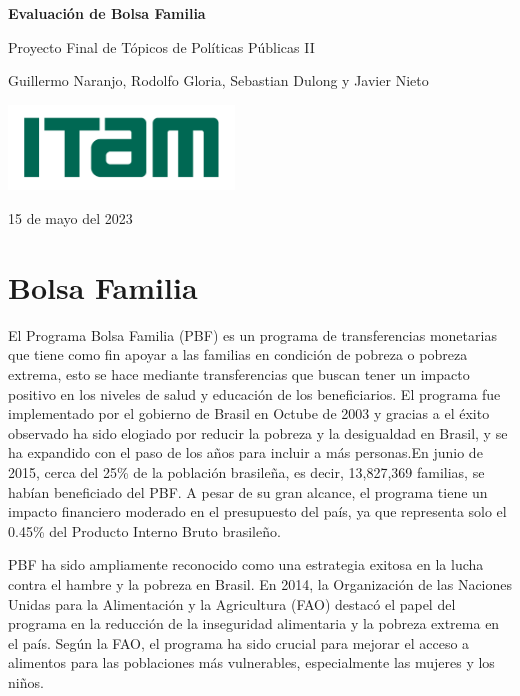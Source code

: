 \documentclass[
]{article}
\author{}
\date{\vspace{-2.5em}}
\begin{document}
\newpage
\thispagestyle{empty}
\vspace*{2.5cm}
\begin{center}
\textbf{\Huge Evaluación de Bolsa Familia}
\vspace{1.5cm}

\vspace{1.5cm}
{\Large Proyecto Final de Tópicos de Políticas Públicas II}
\vspace{0.5cm}

\vspace{0.5cm}
\Large Guillermo Naranjo, Rodolfo Gloria, Sebastian Dulong y Javier Nieto
\vspace{1.5cm}

\includegraphics[width=6cm]{itam.png}

\vfill
15 de mayo del 2023
\end{center}
\newpage
\tableofcontents
\listoftables
\newpage

\hypertarget{bolsa-familia}{%
\section{Bolsa Familia}\label{bolsa-familia}}

El Programa Bolsa Familia (PBF) es un programa de transferencias
monetarias que tiene como fin apoyar a las familias en condición de
pobreza o pobreza extrema, esto se hace mediante transferencias que
buscan tener un impacto positivo en los niveles de salud y educación de
los beneficiarios. El programa fue implementado por el gobierno de
Brasil en Octube de 2003 y gracias a el éxito observado ha sido elogiado
por reducir la pobreza y la desigualdad en Brasil, y se ha expandido con
el paso de los años para incluir a más personas.En junio de 2015, cerca
del 25\% de la población brasileña, es decir, 13,827,369 familias, se
habían beneficiado del PBF. A pesar de su gran alcance, el programa
tiene un impacto financiero moderado en el presupuesto del país, ya que
representa solo el 0.45\% del Producto Interno Bruto brasileño.

PBF ha sido ampliamente reconocido como una estrategia exitosa en la
lucha contra el hambre y la pobreza en Brasil. En 2014, la Organización
de las Naciones Unidas para la Alimentación y la Agricultura (FAO)
destacó el papel del programa en la reducción de la inseguridad
alimentaria y la pobreza extrema en el país. Según la FAO, el programa
ha sido crucial para mejorar el acceso a alimentos para las poblaciones
más vulnerables, especialmente las mujeres y los niños.
\end{document}
